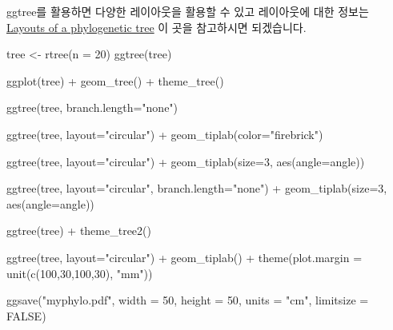 \documentclass[
]{book}
\newenvironment{Shaded}{\begin{snugshade}}{\end{snugshade}}
\newcommand{\AttributeTok}[1]{\textcolor[rgb]{0.77,0.63,0.00}{#1}}
\newcommand{\ConstantTok}[1]{\textcolor[rgb]{0.00,0.00,0.00}{#1}}
\newcommand{\DecValTok}[1]{\textcolor[rgb]{0.00,0.00,0.81}{#1}}
\newcommand{\FunctionTok}[1]{\textcolor[rgb]{0.00,0.00,0.00}{#1}}
\newcommand{\NormalTok}[1]{#1}
\newcommand{\OtherTok}[1]{\textcolor[rgb]{0.56,0.35,0.01}{#1}}
\newcommand{\SpecialCharTok}[1]{\textcolor[rgb]{0.00,0.00,0.00}{#1}}
\newcommand{\StringTok}[1]{\textcolor[rgb]{0.31,0.60,0.02}{#1}}
\begin{document}
ggtree를 활용하면 다양한 레이아웃을 활용할 수 있고 레이아웃에 대한 정보는 \href{https://yulab-smu.top/treedata-book/chapter4.html\#tree-layouts}{Layouts of a phylogenetic tree} 이 곳을 참고하시면 되겠습니다.

\begin{Shaded}
\begin{Highlighting}[]
\NormalTok{tree }\OtherTok{\textless{}{-}} \FunctionTok{rtree}\NormalTok{(}\AttributeTok{n =} \DecValTok{20}\NormalTok{)}
\FunctionTok{ggtree}\NormalTok{(tree)}

\FunctionTok{ggplot}\NormalTok{(tree) }\SpecialCharTok{+}
  \FunctionTok{geom\_tree}\NormalTok{() }\SpecialCharTok{+}
  \FunctionTok{theme\_tree}\NormalTok{()}

\FunctionTok{ggtree}\NormalTok{(tree, }\AttributeTok{branch.length=}\StringTok{"none"}\NormalTok{)}

\FunctionTok{ggtree}\NormalTok{(tree, }\AttributeTok{layout=}\StringTok{"circular"}\NormalTok{) }\SpecialCharTok{+}
  \FunctionTok{geom\_tiplab}\NormalTok{(}\AttributeTok{color=}\StringTok{"firebrick"}\NormalTok{)}

\FunctionTok{ggtree}\NormalTok{(tree, }\AttributeTok{layout=}\StringTok{"circular"}\NormalTok{) }\SpecialCharTok{+}
  \FunctionTok{geom\_tiplab}\NormalTok{(}\AttributeTok{size=}\DecValTok{3}\NormalTok{, }\FunctionTok{aes}\NormalTok{(}\AttributeTok{angle=}\NormalTok{angle))}

\FunctionTok{ggtree}\NormalTok{(tree, }\AttributeTok{layout=}\StringTok{"circular"}\NormalTok{, }\AttributeTok{branch.length=}\StringTok{"none"}\NormalTok{) }\SpecialCharTok{+}
  \FunctionTok{geom\_tiplab}\NormalTok{(}\AttributeTok{size=}\DecValTok{3}\NormalTok{, }\FunctionTok{aes}\NormalTok{(}\AttributeTok{angle=}\NormalTok{angle))}

\FunctionTok{ggtree}\NormalTok{(tree) }\SpecialCharTok{+}
  \FunctionTok{theme\_tree2}\NormalTok{() }

\FunctionTok{ggtree}\NormalTok{(tree, }\AttributeTok{layout=}\StringTok{"circular"}\NormalTok{) }\SpecialCharTok{+}
  \FunctionTok{geom\_tiplab}\NormalTok{() }\SpecialCharTok{+} 
  \FunctionTok{theme}\NormalTok{(}\AttributeTok{plot.margin =} \FunctionTok{unit}\NormalTok{(}\FunctionTok{c}\NormalTok{(}\DecValTok{100}\NormalTok{,}\DecValTok{30}\NormalTok{,}\DecValTok{100}\NormalTok{,}\DecValTok{30}\NormalTok{), }\StringTok{"mm"}\NormalTok{))}

\FunctionTok{ggsave}\NormalTok{(}\StringTok{"myphylo.pdf"}\NormalTok{, }\AttributeTok{width =} \DecValTok{50}\NormalTok{, }\AttributeTok{height =} \DecValTok{50}\NormalTok{, }\AttributeTok{units =} \StringTok{"cm"}\NormalTok{, }\AttributeTok{limitsize =} \ConstantTok{FALSE}\NormalTok{)}
\end{Highlighting}
\end{Shaded}
\end{document}
